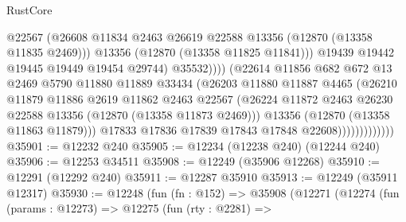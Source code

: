\begin{lexlean}{RustCore}
\begin{coremodule}
                                      @22567
                                      (@26608
                                        @11834
                                        @2463
                                        @26619
                                        @22588
                                        @13356
                                        (@12870 (@13358 @11835 @2469)))
                                      @13356
                                      (@12870 (@13358 @11825 @11841)))
                                    @19439
                                    @19442
                                    @19445
                                    @19449
                                    @19454
                                    @29744)
                                  @35532))))
                          (@22614
                            @11856
                            @682
                            @672
                            @13
                            @2469
                            @5790
                            @11880
                            @11889
                            @33434
                            (@26203
                              @11880
                              @11887
                              @4465
                              (@26210
                                @11879
                                @11886
                                @2619
                                @11862
                                @2463
                                @22567
                                (@26224
                                  @11872
                                  @2463
                                  @26230
                                  @22588
                                  @13356
                                  (@12870 (@13358 @11873 @2469)))
                                @13356
                                (@12870 (@13358 @11863 @11879)))
                              @17833
                              @17836
                              @17839
                              @17843
                              @17848
                              @22608)))))))))))))
@35901 := @12232 @240
@35905 := @12234 (@12238 @240) (@12244 @240)
@35906 := @12253 @34511
@35908 := @12249 (@35906 @12268)
@35910 := @12291 (@12292 @240)
@35911 := @12287 @35910
@35913 := @12249 (@35911 @12317)
@35930 := @12248
    (fun (fn : @152) =>
    @35908
      (@12271
        (@12274
          (fun (params : @12273) =>
          @12275
            (fun (rty : @2281) =>

\end{coremodule}
\end{lexlean}
